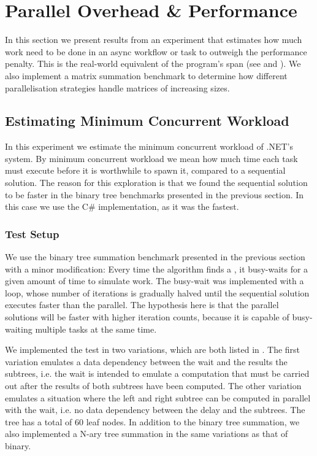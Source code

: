 \section{Parallel Overhead \& Performance}\label{sec:crit:work}
In this section we present results from an experiment that estimates how much work need to be done in an async workflow or task to outweigh the performance penalty. This is the real-world equivalent of the program's span (see  and ). We also implement a matrix summation benchmark to determine how different parallelisation strategies handle matrices of increasing sizes.

\subsection{Estimating Minimum Concurrent Workload}
In this experiment we estimate the minimum concurrent workload of .NET's  system. By minimum concurrent workload we mean how much time each task must execute before it is worthwhile to spawn it, compared to a sequential solution. The reason for this exploration is that we found the sequential solution to be faster in the binary tree benchmarks presented in the previous section. In this case we use the C\# implementation, as it was the fastest.

\subsubsection{Test Setup}
We use the binary tree summation benchmark presented in the previous section with a minor modification: Every time the algorithm finds a , it busy-waits for a given amount of time to simulate work. The busy-wait was implemented with a loop, whose number of iterations is gradually halved until the sequential solution executes faster than the parallel. The hypothesis here is that the parallel solutions will be faster with higher iteration counts, because it is capable of busy-waiting multiple tasks at the same time.

We implemented the test in two variations, which are both listed in . The first variation emulates a data dependency between the wait and the results the subtrees, i.e. the wait is intended to emulate a computation that must be carried out after the results of both subtrees have been computed. The other variation emulates a situation where the left and right subtree can be computed in parallel with the wait, i.e. no data dependency between the delay and the subtrees. The tree has a total of 60 leaf nodes. In addition to the binary tree summation, we also implemented a N-ary tree summation in the same variations as that of binary.

